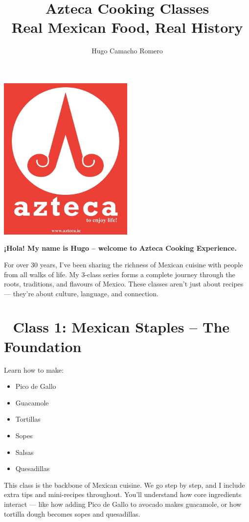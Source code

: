 \documentclass[12pt]{article}
\title{\Huge \textbf{Azteca Cooking Classes}\\[1ex] \Large Real Mexican Food, Real History}
\author{\Large Hugo Camacho Romero}
\date{}
\begin{document}
\maketitle

\begin{center}
\includegraphics[width=0.5\textwidth]{assets/images/azteca-logo.png}
\end{center}

\noindent
\textbf{¡Hola! My name is Hugo – welcome to Azteca Cooking Experience.}

For over 30 years, I’ve been sharing the richness of Mexican cuisine with people from all walks of life. My 3-class series forms a complete journey through the roots, traditions, and flavours of Mexico. These classes aren’t just about recipes — they’re about culture, language, and connection.

\vspace{1em}
\section*{🌽 Class 1: Mexican Staples – The Foundation}

Learn how to make:
\begin{itemize}
\item Pico de Gallo
\item Guacamole
\item Tortillas
\item Sopes
\item Salsas
\item Quesadillas
\end{itemize}

This class is the backbone of Mexican cuisine. We go step by step, and I include extra tips and mini-recipes throughout. You'll understand how core ingredients interact — like how adding Pico de Gallo to avocado makes guacamole, or how tortilla dough becomes sopes and quesadillas.
\end{document}
